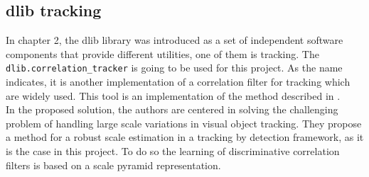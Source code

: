 \subsection{dlib tracking}
In chapter 2, the dlib library was introduced as a set of independent software components that provide different utilities, one of them is tracking. The \texttt{dlib.correlation\_tracker} is going to be used for this project. As the name indicates, it is another implementation of a correlation filter for tracking which are widely used. This tool is an implementation of the method described in \cite{danelljan2014accurate}.\\ In the proposed solution, the authors are centered in solving the challenging problem of handling large scale variations in visual object tracking. They propose a method for a robust scale estimation in a tracking by detection framework, as it is the case in this project. To do so the learning of discriminative correlation filters is based on a scale pyramid representation.
